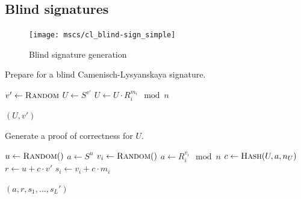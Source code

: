 \subsection{Blind signatures}\label{sec:cl_blind}

\begin{figure}
  \centering
  \texttt{[image: mscs/cl\_blind-sign\_simple]}
  \caption{Blind signature generation}
  \label{msc:cl_blind-sign}
\end{figure}



\begin{algorithm}
  \caption{Prepare for a blind Camenisch-Lysyanskaya signature.}
  \label{alg:CL-blind-prepare}
  \addtolength{\baselineskip}{1mm}
  \begin{algorithmic}[1]
      \State $v' \gets \Call{Random}{}$
      \State $U \gets S^{v'}$
        \State $U \gets U \cdot R_i^{m_i} \mod n$
      \EndFor

      \Return $(U, v')$
    \EndFunction
  \end{algorithmic}
\end{algorithm}

\begin{algorithm}
  \caption{Generate a proof of correctness for $U$.}
  \label{alg:CL-proof-U}
  \addtolength{\baselineskip}{1mm}
  \begin{algorithmic}[1]
      \State $u \gets \Call{Random}$
      \State $a \gets S^u$
        \State $v_i \gets \Call{Random}$
        \State $a \gets R_i^{v_i} \mod n$
      \EndFor
      \State $c \gets \Call{Hash}{U, a, n_U}$
      \State $r \gets u + c \cdot v'$
        \State $s_i \gets v_i + c \cdot m_i$
      \EndFor

      \Return $(a, r, s_1, \dots, s_L')$
    \EndFunction
  \end{algorithmic}
\end{algorithm}

